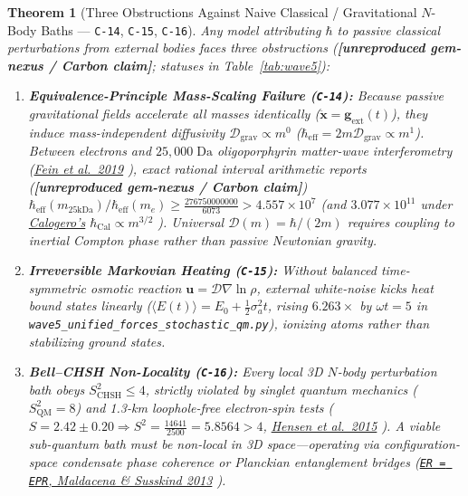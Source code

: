 \documentclass[11pt,letterpaper]{article}
\newtheorem{theorem}{Theorem}
\newcommand{\unrepro}{\textbf{\textcolor{red!60!black}{[unreproduced gem-nexus / Carbon claim]}}}
\begin{document}
\begin{theorem}[Three Obstructions Against Naive Classical / Gravitational $N$-Body Baths --- \texttt{C-14}, \texttt{C-15}, \texttt{C-16}]
Any model attributing $\hbar$ to passive classical perturbations from external bodies faces three obstructions (\unrepro; statuses in Table~\ref{tab:wave5}):
\begin{enumerate}
  \setlength{\itemsep}{2pt}\setlength{\parskip}{0pt}
  \item \textbf{Equivalence-Principle Mass-Scaling Failure (\texttt{C-14}):} Because passive gravitational fields accelerate all masses identically ($\ddot{\mathbf{x}} = \mathbf{g}_{\mathrm{ext}}(t)$), they induce mass-independent diffusivity $\mathcal{D}_{\mathrm{grav}} \propto m^0$ ($\hbar_{\mathrm{eff}} = 2m\mathcal{D}_{\mathrm{grav}} \propto m^1$). Between electrons and $25{,}000\;\mathrm{Da}$ oligoporphyrin matter-wave interferometry (\href{https://www.researchgate.net/publication/335990763_Quantum_superposition_of_molecules_beyond_25_kDa}{Fein et al.\ 2019} \cite{Fein2019}), exact rational interval arithmetic reports (\unrepro) $\hbar_{\mathrm{eff}}(m_{25\mathrm{kDa}})/\hbar_{\mathrm{eff}}(m_e) \ge \frac{276750000000}{6073} > 4.557\times 10^7$ (and $3.077\times 10^{11}$ under \href{https://www.worldscientific.com/doi/abs/10.1142/S0217979204024136}{Calogero's} $\hbar_{\mathrm{Cal}} \propto m^{3/2}$ \cite{Calogero2004}). Universal $\mathcal{D}(m) = \hbar/(2m)$ requires coupling to inertial Compton phase rather than passive Newtonian gravity.
  \item \textbf{Irreversible Markovian Heating (\texttt{C-15}):} Without balanced time-symmetric osmotic reaction $\mathbf{u} = \mathcal{D}\nabla\ln\rho$, external white-noise kicks heat bound states linearly ($\langle E(t)\rangle = E_0 + \frac{1}{2}\sigma_a^2 t$, rising $6.263\times$ by $\omega t = 5$ in \texttt{wave5\_unified\_forces\_stochastic\_qm.py}), ionizing atoms rather than stabilizing ground states.
  \item \textbf{Bell--CHSH Non-Locality (\texttt{C-16}):} Every local 3D $N$-body perturbation bath obeys $S_{\mathrm{CHSH}}^2 \le 4$, strictly violated by singlet quantum mechanics ($S_{\mathrm{QM}}^2 = 8$) and 1.3-km loophole-free electron-spin tests ($S = 2.42 \pm 0.20 \Rightarrow S^2 = \frac{14641}{2500} = 5.8564 > 4$, \href{https://pubmed.ncbi.nlm.nih.gov/26503041/}{Hensen et al.\ 2015} \cite{Hensen2015}). A viable sub-quantum bath must be non-local in 3D space---operating via configuration-space condensate phase coherence or Planckian entanglement bridges (\href{https://arxiv.org/abs/1306.0533}{\texttt{ER = EPR}, Maldacena \& Susskind 2013} \cite{MaldacenaSusskind2013}).
\end{enumerate}
\end{theorem}
\end{document}
